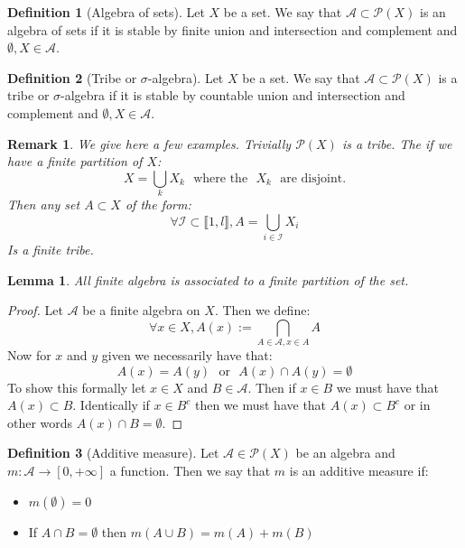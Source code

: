 \documentclass[10pt,a4paper]{book}
\newtheorem{lemma}[theorem]{Lemma}
\newtheorem*{remark}{Remark}
\theoremstyle{definition}
\newtheorem{definition}{Definition}[section]
\begin{document}
\begin{definition}[Algebra of sets]
Let $X$ be a set. We say that $\mathcal{A} \subset \mathcal{P}(X)$ is an algebra of sets if it is stable by finite union and intersection and complement and $\emptyset, X \in \mathcal{A}$. 
\end{definition}

\begin{definition}[Tribe or $\sigma$-algebra]
Let $X$ be a set. We say that $\mathcal{A} \subset \mathcal{P}(X)$ is a tribe or $\sigma$-algebra if it is stable by countable union and intersection and complement and $\emptyset, X \in \mathcal{A}$. 
\end{definition}

\begin{remark}
We give here a few examples. Trivially $\mathcal{P}(X)$ is a tribe. The if we have a finite partition of $X$:
\[
X = \bigcup_{k} X_k \mbox{~~where the~~} X_k \mbox{~~are disjoint.}
\]
Then any set $A \subset X$ of the form:
\[
\forall \mathcal{I} \subset \llbracket 1, l \rrbracket, A = \bigcup_{i \in \mathcal{I}} X_i
\]
Is a finite tribe.
\end{remark}

\begin{lemma}
All finite algebra is associated to a finite partition of the set. 
\end{lemma}

\begin{proof}

Let $\mathcal{A}$ be a finite algebra on $X$. Then we define:
\[
\forall x \in X, A(x) := \bigcap_{A \in \mathcal{A}, x \in A} A
\]
Now for $x$ and $y$ given we necessarily have that:
\[
A(x) = A(y) \mbox{~~or~~} A(x) \cap A(y) = \emptyset
\]
To show this formally let $x \in X$ and $B \in \mathcal{A}$. Then if $x \in B$ we must have that $A(x) \subset B$. Identically if $x \in B^c$ then we must have that $A(x) \subset B^c$ or in other words $A(x) \cap B = \emptyset$. 

\end{proof}

\begin{definition}[Additive measure]
Let $\mathcal{A} \in \mathcal{P}(X)$ be an algebra and $m : \mathcal{A} \to [0, +\infty]$ a function. Then we say that $m$ is an additive measure if:
\begin{itemize}
\item $m(\emptyset) = 0$
\item If $A \cap B = \emptyset$ then $m(A \cup B) = m(A) + m(B)$
\end{itemize}
\end{definition}
\end{document}
